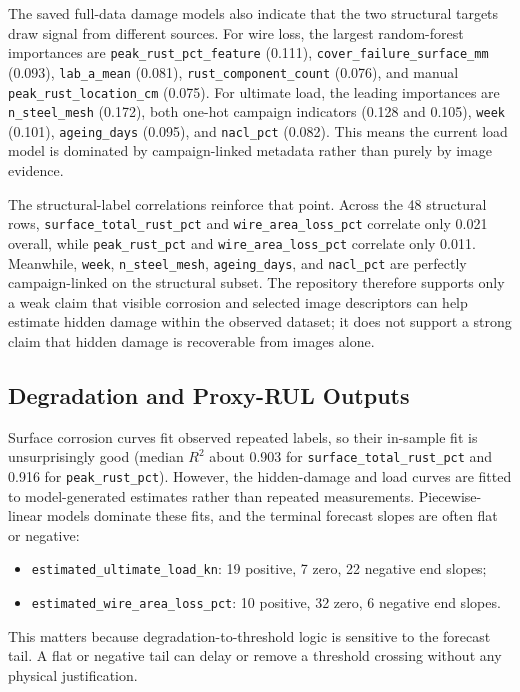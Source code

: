 \documentclass[11pt,a4paper]{article}
\begin{document}
The saved full-data damage models also indicate that the two structural targets draw signal from different sources. For wire loss, the largest random-forest importances are \texttt{peak\_rust\_pct\_feature} (0.111), \texttt{cover\_failure\_surface\_mm} (0.093), \texttt{lab\_a\_mean} (0.081), \texttt{rust\_component\_count} (0.076), and manual \texttt{peak\_rust\_location\_cm} (0.075). For ultimate load, the leading importances are \texttt{n\_steel\_mesh} (0.172), both one-hot campaign indicators (0.128 and 0.105), \texttt{week} (0.101), \texttt{ageing\_days} (0.095), and \texttt{nacl\_pct} (0.082). This means the current load model is dominated by campaign-linked metadata rather than purely by image evidence.

The structural-label correlations reinforce that point. Across the 48 structural rows, \texttt{surface\_total\_rust\_pct} and \texttt{wire\_area\_loss\_pct} correlate only 0.021 overall, while \texttt{peak\_rust\_pct} and \texttt{wire\_area\_loss\_pct} correlate only 0.011. Meanwhile, \texttt{week}, \texttt{n\_steel\_mesh}, \texttt{ageing\_days}, and \texttt{nacl\_pct} are perfectly campaign-linked on the structural subset. The repository therefore supports only a weak claim that visible corrosion and selected image descriptors can help estimate hidden damage within the observed dataset; it does not support a strong claim that hidden damage is recoverable from images alone.

\subsection{Degradation and Proxy-RUL Outputs}

Surface corrosion curves fit observed repeated labels, so their in-sample fit is unsurprisingly good (median \(R^2\) about 0.903 for \texttt{surface\_total\_rust\_pct} and 0.916 for \texttt{peak\_rust\_pct}). However, the hidden-damage and load curves are fitted to model-generated estimates rather than repeated measurements. Piecewise-linear models dominate these fits, and the terminal forecast slopes are often flat or negative:
\begin{itemize}
  \item \texttt{estimated\_ultimate\_load\_kn}: 19 positive, 7 zero, 22 negative end slopes;
  \item \texttt{estimated\_wire\_area\_loss\_pct}: 10 positive, 32 zero, 6 negative end slopes.
\end{itemize}

This matters because degradation-to-threshold logic is sensitive to the forecast tail. A flat or negative tail can delay or remove a threshold crossing without any physical justification.
\end{document}

